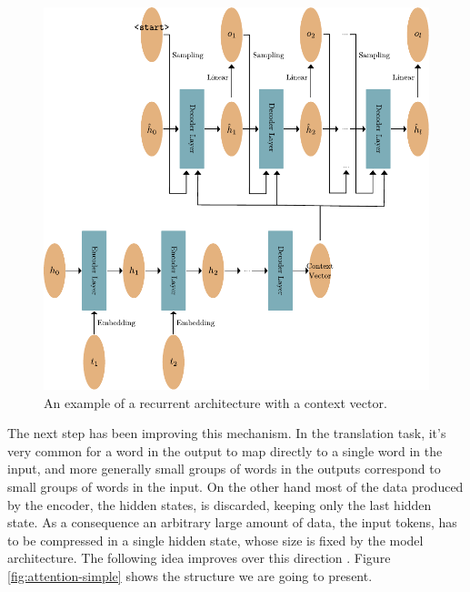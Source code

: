 \documentclass[]{marticle}
\begin{document}
\begin{figure}[!tb] 
\begin{center}
\includegraphics{recurrent_context.pdf}
\caption{An example of a recurrent architecture with a context vector.}
\label{fig:recurrent-context} 
\end{center}
\end{figure}

The next step has been improving this mechanism. In the translation task, it's very common for a
word in the output to map directly to a single word in the input, and more generally small groups of
words in the outputs correspond to small groups of words in the input. On the other hand most of the
data produced by the encoder, the hidden states, is discarded, keeping only the last hidden state.
As a consequence an arbitrary large amount of data, the input tokens, has to be compressed in a
single hidden state, whose size is fixed by the model architecture. The following idea improves over
this direction \cite{attention-translation}. Figure \ref{fig:attention-simple} shows the structure
we are going to present.
\end{document}
